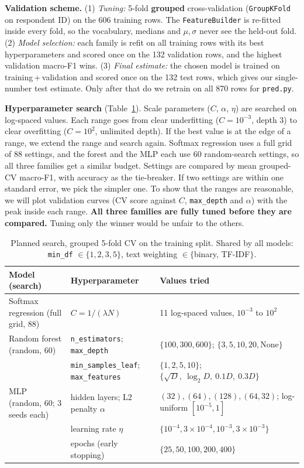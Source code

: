 \documentclass[12pt]{article}
\begin{document}
\textbf{Validation scheme.} (1) \emph{Tuning:} 5-fold \textbf{grouped} cross-validation (\texttt{GroupKFold} on respondent ID) on the 606 training rows. The \texttt{FeatureBuilder} is re-fitted inside every fold, so the vocabulary, medians and $\mu,\sigma$ never see the held-out fold. (2) \emph{Model selection:} each family is refit on all training rows with its best hyperparameters and scored once on the 132 validation rows, and the highest validation macro-F1 wins. (3) \emph{Final estimate:} the chosen model is trained on training\,+\,validation and scored once on the 132 test rows, which gives our single-number test estimate. Only after that do we retrain on all 870 rows for \texttt{pred.py}.

\textbf{Hyperparameter search} (Table~\ref{tab:hparams}). Scale parameters ($C$, $\alpha$, $\eta$) are searched on log-spaced values. Each range goes from clear underfitting ($C=10^{-3}$, depth 3) to clear overfitting ($C=10^{2}$, unlimited depth). If the best value is at the edge of a range, we extend the range and search again. Softmax regression uses a full grid of 88 settings, and the forest and the MLP each use 60 random-search settings, so all three families get a similar budget. Settings are compared by mean grouped-CV macro-F1, with accuracy as the tie-breaker. If two settings are within one standard error, we pick the simpler one. To show that the ranges are reasonable, we will plot validation curves (CV score against $C$, \texttt{max\_depth} and $\alpha$) with the peak inside each range. \textbf{All three families are fully tuned before they are compared.} Tuning only the winner would be unfair to the others.

\begin{table}[h]
\centering\footnotesize
\caption{Planned search, grouped 5-fold CV on the training split. Shared by all models: \texttt{min\_df} $\in\{1,2,3,5\}$, text weighting $\in\{$binary, TF-IDF$\}$.}\label{tab:hparams}
\begin{tabular}{@{}lll@{}}
\toprule
Model (search) & Hyperparameter & Values tried \\
\midrule
Softmax regression (full grid, 88) & $C = 1/(\lambda N)$ & 11 log-spaced values, $10^{-3}$ to $10^{2}$ \\
\midrule
Random forest (random, 60) & \texttt{n\_estimators}; \texttt{max\_depth} & $\{100, 300, 600\}$; $\{3, 5, 10, 20, \text{None}\}$ \\
 & \texttt{min\_samples\_leaf}; \texttt{max\_features} & $\{1, 2, 5, 10\}$; $\{\sqrt{D},\ \log_2 D,\ 0.1D,\ 0.3D\}$ \\
\midrule
MLP (random, 60; 3 seeds each) & hidden layers; L2 penalty $\alpha$ & $(32), (64), (128), (64,32)$; log-uniform $[10^{-5}, 1]$ \\
 & learning rate $\eta$ & $\{10^{-4}, 3\!\times\!10^{-4}, 10^{-3}, 3\!\times\!10^{-3}\}$ \\
 & epochs (early stopping) & $\{25, 50, 100, 200, 400\}$ \\
\bottomrule
\end{tabular}
\end{table}
\end{document}
